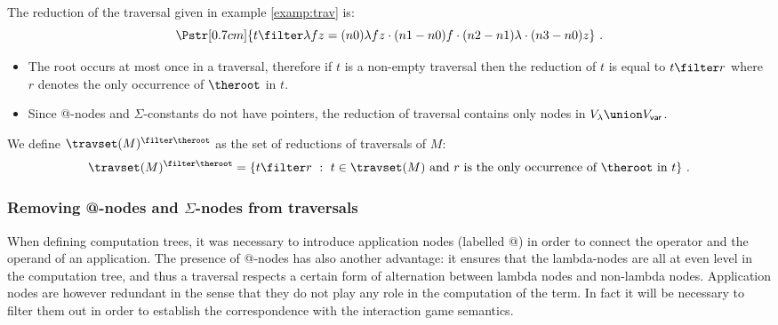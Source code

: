 \begin{example}
The reduction of the traversal given in example \ref{examp:trav} is:
$$ \Pstr[0.7cm]{t \filter \lambda f z = (n0){\lambda f z} \cdot (n1-n0){f}\cdot (n2-n1){\lambda }\cdot (n3-n0){z} } \ .$$
\end{example}


\begin{remark}\hfill
  \begin{itemize}
    \item The root occurs at most once in a traversal, therefore if $t$ is a non-empty traversal then the reduction of $t$ is equal to $t\filter r$ where $r$ denotes the only occurrence of $\theroot$ in $t$.
    \item Since @-nodes and $\Sigma$-constants do not have pointers, the reduction of traversal contains only nodes in $V_\lambda \union V_{\sf var}$.
\end{itemize}
\end{remark}

We define $\travset(M)^{\filter \theroot}$ as the set of reductions of traversals of $M$:
$$\travset(M)^{\filter \theroot} = \{ t \filter r\ :\  t  \in \travset(M) \hbox{ and $r$ is the only occurrence of $\theroot$ in $t$}\} \ . $$


\subsubsection{Removing @-nodes and \texorpdfstring{$\Sigma$}{constant}-nodes from traversals}
\label{subsec:tstar}

When defining computation trees, it was necessary to introduce
application nodes (labelled @) in order to connect the operator and
the operand of an application. The presence of @-nodes has also
another advantage: it ensures that the lambda-nodes are all at even
level in the computation tree, and thus a traversal respects a
certain form of alternation between lambda nodes and non-lambda
nodes. Application nodes are however redundant in the sense that
they do not play any role in the computation of the term. In fact it
will be necessary to filter them out in order to establish the
correspondence with the interaction game semantics.


